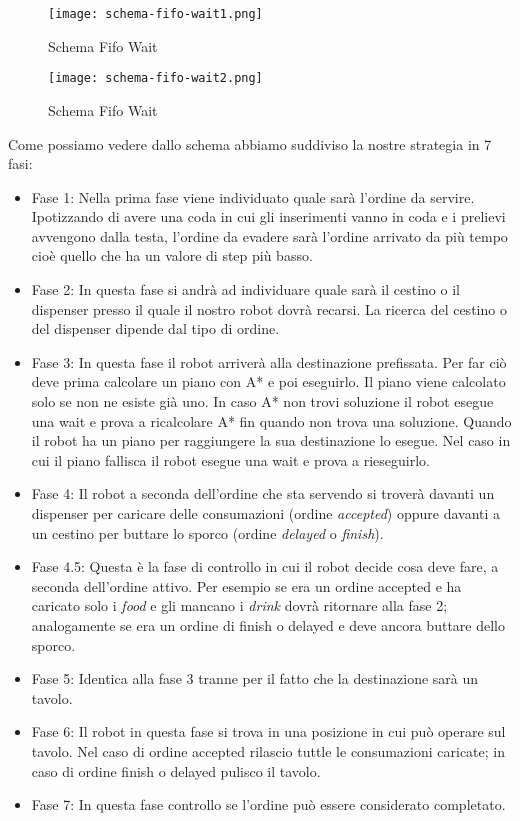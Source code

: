 \begin{figure}[htp]
  \texttt{[image: schema-fifo-wait1.png]}
  \caption{Schema Fifo Wait}
  \label{fig:figure1}
\end{figure}

\begin{figure}[htp]
  \texttt{[image: schema-fifo-wait2.png]}
  \caption{Schema Fifo Wait}
  \label{fig:figure2}
\end{figure}

Come possiamo vedere dallo schema abbiamo suddiviso la nostre strategia in 7 fasi:
\begin{itemize}
  \item Fase 1: Nella prima fase viene individuato quale sarà l'ordine da servire. Ipotizzando di avere una coda in cui gli inserimenti vanno in coda e i prelievi avvengono dalla testa, l'ordine da evadere sarà l'ordine arrivato da più tempo cioè quello che ha un valore di step più basso.
  \item Fase 2: In questa fase si andrà ad individuare quale sarà il cestino o il dispenser presso il quale il nostro robot dovrà recarsi. La ricerca del cestino o del dispenser dipende dal tipo di ordine.
  \item Fase 3: In questa fase il robot arriverà alla destinazione prefissata. Per far ciò deve prima calcolare un piano con A* e poi eseguirlo. Il piano viene calcolato solo se non ne esiste già uno. In caso A* non trovi soluzione il robot esegue una wait e prova a ricalcolare A* fin quando non trova una soluzione.
  Quando il robot ha un piano per raggiungere la sua destinazione lo esegue. Nel caso in cui il piano fallisca il robot esegue una wait e prova a rieseguirlo.
  \item Fase 4: Il robot a seconda dell'ordine che sta servendo si troverà davanti un dispenser per caricare delle consumazioni (ordine \emph{accepted}) oppure davanti a un cestino per buttare lo sporco (ordine \emph{delayed} o \emph{finish}).
  \item Fase 4.5: Questa è la fase di controllo in cui il robot decide cosa deve fare, a seconda dell'ordine attivo. Per esempio se era un ordine accepted e ha caricato solo i \emph{food} e gli mancano i \emph{drink} dovrà ritornare alla fase 2; analogamente se era un ordine di finish o delayed e deve ancora buttare dello sporco.
  \item Fase 5: Identica alla fase 3 tranne per il fatto che la destinazione sarà un tavolo.
  \item Fase 6: Il robot in questa fase si trova in una posizione in cui può operare sul tavolo. Nel caso di ordine accepted rilascio tuttle le consumazioni caricate; in caso di ordine finish o delayed pulisco il tavolo.
  \item Fase 7: In questa fase controllo se l'ordine può essere considerato completato.
\end{itemize}


